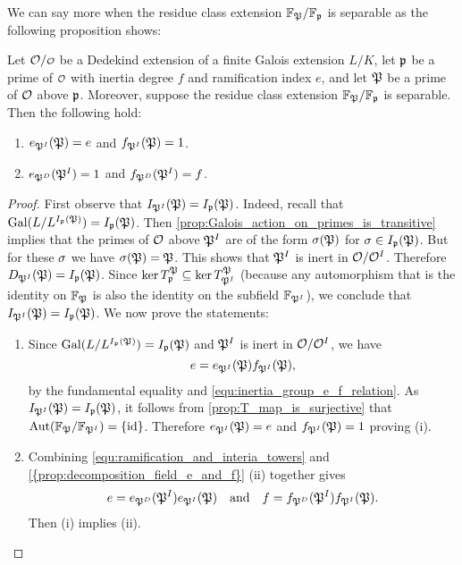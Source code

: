     We can say more when the residue class extension $\mathbb{F}_{\mathfrak{P}}/\mathbb{F}_{\mathfrak{p}}$ is separable as the following proposition shows:

    \begin{proposition}\label{prop:inertia_field_e_and_f}
      Let $\mc{O}/\smc{O}$ be a Dedekind extension of a finite Galois extension $L/K$, let $\mathfrak{p}$ be a prime of $\smc{O}$ with inertia degree $f$ and ramification index $e$, and let $\mathfrak{P}$ be a prime of $\mathcal{O}$ above $\mathfrak{p}$. Moreover, suppose the residue class extension $\mathbb{F}_{\mathfrak{P}}/\mathbb{F}_{\mathfrak{p}}$ is separable. Then the following hold:
      \begin{enumerate}[label=(\roman*)]
        \item $e_{\mathfrak{P}^{I}}(\mathfrak{P}) = e$ and $f_{\mathfrak{P}^{I}}(\mathfrak{P}) = 1$.
        \item $e_{\mathfrak{P}^{D}}(\mathfrak{P}^{I}) = 1$ and $f_{\mathfrak{P}^{D}}(\mathfrak{P}^{I}) = f$.
      \end{enumerate}
    \end{proposition}
    \begin{proof}
      First observe that $I_{\mathfrak{P}^{I}}(\mathfrak{P}) = I_{\mathfrak{p}}(\mathfrak{P})$. Indeed, recall that $\operatorname{\mathrm{Gal}}(L/L^{I_{\mathfrak{p}}(\mathfrak{P})}) = I_{\mathfrak{p}}(\mathfrak{P})$. Then \cref{prop:Galois_action_on_primes_is_transitive} implies that the primes of $\mathcal{O}$ above $\mathfrak{P}^{I}$ are of the form $\sigma(\mathfrak{P})$ for $\sigma \in I_{\mathfrak{p}}(\mathfrak{P})$. But for these $\sigma$ we have $\sigma(\mathfrak{P}) = \mathfrak{P}$. This shows that $\mathfrak{P}^{I}$ is inert in $\mathcal{O}/\mathcal{O}^{I}$. Therefore $D_{\mathfrak{P}^{I}}(\mathfrak{P}) = I_{\mathfrak{p}}(\mathfrak{P})$. Since $\ker T_{\mathfrak{p}}^{\mathfrak{P}} \subseteq \ker T_{\mathfrak{P}^{I}}^{\mathfrak{P}}$ (because any automorphism that is the identity on $\mathbb{F}_{\mathfrak{P}}$ is also the identity on the subfield $\mathbb{F}_{\mathfrak{P}^{I}}$), we conclude that $I_{\mathfrak{P}^{I}}(\mathfrak{P}) = I_{\mathfrak{p}}(\mathfrak{P})$. We now prove the statements:
      \begin{enumerate}[label=(\roman*)]
        \item Since $\operatorname{\mathrm{Gal}}(L/L^{I_{\mathfrak{p}}(\mathfrak{P})}) = I_{\mathfrak{p}}(\mathfrak{P})$ and $\mathfrak{P}^{I}$ is inert in $\mathcal{O}/\mathcal{O}^{I}$, we have
        \[
          e = e_{\mathfrak{P}^{I}}(\mathfrak{P})f_{\mathfrak{P}^{I}}(\mathfrak{P}),
        \]
        by the fundamental equality and \cref{equ:inertia_group_e_f_relation}. As $I_{\mathfrak{P}^{I}}(\mathfrak{P}) = I_{\mathfrak{p}}(\mathfrak{P})$, it follows from \cref{prop:T_map_is_surjective} that $\operatorname{\mathrm{Aut}}(\mathbb{F}_{\mathfrak{P}}/\mathbb{F}_{\mathfrak{P}^{I}}) = \{\operatorname{\textrm{id}}\}$. Therefore $e_{\mathfrak{P}^{I}}(\mathfrak{P}) = e$ and $f_{\mathfrak{P}^{I}}(\mathfrak{P}) = 1$ proving (i).
        \item Combining \cref{equ:ramification_and_interia_towers} and \cref{{prop:decomposition_field_e_and_f}} (ii) together gives
        \[
          e = e_{\mathfrak{P}^{D}}(\mathfrak{P}^{I})e_{\mathfrak{P}^{I}}(\mathfrak{P}) \quad \text{and} \quad f = f_{\mathfrak{P}^{D}}(\mathfrak{P}^{I})f_{\mathfrak{P}^{I}}(\mathfrak{P}).
        \]
        Then (i) implies (ii).
      \end{enumerate}
    \end{proof}

